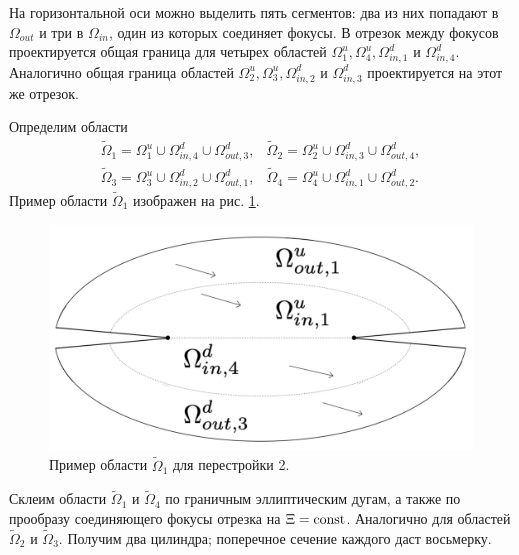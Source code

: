 На горизонтальной оси можно выделить пять сегментов: два из них попадают в $\Omega_{out}$ и три в $\Omega_{in}$, один из которых соединяет фокусы.
В отрезок между фокусов проектируется общая граница для четырех областей $\Omega_1^u, \Omega_4^u, \Omega_{in, 1}^d$ и $\Omega_{in, 4}^d$.
Аналогично общая граница областей $\Omega_2^u, \Omega_3^u, \Omega_{in, 2}^d$ и $\Omega_{in, 3}^d$ проектируется на этот же отрезок.

Определим области 
\begin{equation}
\begin{array}{cc}
\widetilde{\Omega}_1 = \Omega_1^u \cup \Omega_{in, 4}^d \cup \Omega_{out, 3}^d, &
\widetilde{\Omega}_2 = \Omega_2^u \cup \Omega_{in, 3}^d \cup \Omega_{out, 4}^d, \\
\widetilde{\Omega}_3 = \Omega_3^u \cup \Omega_{in, 2}^d \cup \Omega_{out, 1}^d, &
\widetilde{\Omega}_4 = \Omega_4^u \cup \Omega_{in, 1}^d \cup \Omega_{out, 2}^d. 
\end{array}
\label{eq:case2Omegas}
\end{equation}
Пример области $\widetilde{\Omega}_1$ изображен на рис. \ref{fig:pt9:_domain_atom_foc_ell}.
 \begin{figure}[!htb]
\centering
\includegraphics[scale=0.125]{images/ch4/section2/atoms/domain_atom_foc_ell.pdf}
    \caption{Пример области $\widetilde{\Omega}_1$ для перестройки 2.}
    \label{fig:pt9:_domain_atom_foc_ell}
\end{figure}
 
Склеим области $\widetilde{\Omega}_1$ и $\widetilde{\Omega}_4$ по граничным эллиптическим дугам, а также по прообразу соединяющего фокусы отрезка на $\Xi = \mathrm{const}$. Аналогично для областей $\widetilde{\Omega}_2$ и $\widetilde{\Omega}_3$. Получим два цилиндра; поперечное сечение каждого даст восьмерку. 


